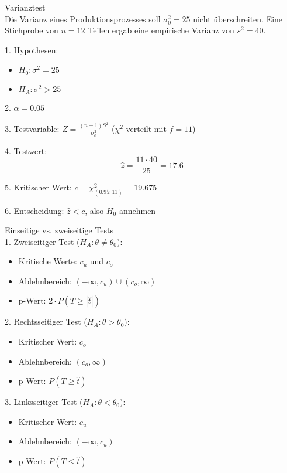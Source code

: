 \begin{example2}{Varianztest}\\
Die Varianz eines Produktionsprozesses soll $\sigma_0^2 = 25$ nicht überschreiten. Eine Stichprobe von $n=12$ Teilen ergab eine empirische Varianz von $s^2 = 40$.

1. Hypothesen:
   \begin{itemize}
     \item $H_0: \sigma^2 = 25$
     \item $H_A: \sigma^2 > 25$
   \end{itemize}

2. $\alpha = 0.05$

3. Testvariable: $Z = \frac{(n-1)S^2}{\sigma_0^2}$ ($\chi^2$-verteilt mit $f=11$)

4. Testwert:
   $$\hat{z} = \frac{11 \cdot 40}{25} = 17.6$$

5. Kritischer Wert: $c = \chi^2_{(0.95;11)} = 19.675$

6. Entscheidung: $\hat{z} < c$, also $H_0$ annehmen
\end{example2}

\begin{concept}{Einseitige vs. zweiseitige Tests}\\
1. Zweiseitiger Test ($H_A: \theta \neq \theta_0$):
   \begin{itemize}
     \item Kritische Werte: $c_u$ und $c_o$
     \item Ablehnbereich: $(-\infty,c_u) \cup (c_o,\infty)$
     \item p-Wert: $2 \cdot P(T \geq |\hat{t}|)$
   \end{itemize}

2. Rechtsseitiger Test ($H_A: \theta > \theta_0$):
   \begin{itemize}
     \item Kritischer Wert: $c_o$
     \item Ablehnbereich: $(c_o,\infty)$
     \item p-Wert: $P(T \geq \hat{t})$
   \end{itemize}

3. Linksseitiger Test ($H_A: \theta < \theta_0$):
   \begin{itemize}
     \item Kritischer Wert: $c_u$
     \item Ablehnbereich: $(-\infty,c_u)$
     \item p-Wert: $P(T \leq \hat{t})$
   \end{itemize}
\end{concept}

